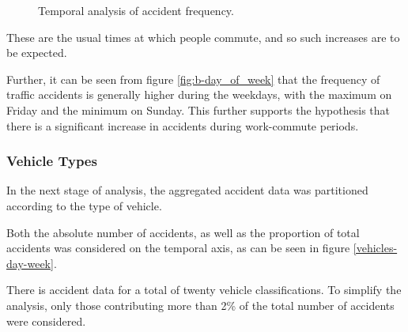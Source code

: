 \documentclass[12pt]{article}
\begin{document}
\begin{figure}[h]
\centering     %
{}
\caption{Temporal analysis of accident frequency.}
\end{figure}

These are the usual times at which people commute, and so such increases are to be expected.

Further, it can be seen from figure \ref{fig:b-day_of_week} that the frequency of traffic accidents is generally higher during the weekdays, with the maximum on Friday and the minimum on Sunday. This further supports the hypothesis that there is a significant increase in accidents during work-commute periods.

\subsubsection{Vehicle Types}

In the next stage of analysis, the aggregated accident data was partitioned according to the type of vehicle.

Both the absolute number of accidents, as well as the proportion of total accidents was considered on the temporal axis, as can be seen in figure \ref{vehicles-day-week}.

There is accident data for a total of twenty vehicle classifications. To simplify the analysis, only those contributing more than 2\% of the total number of accidents were considered.
\end{document}
